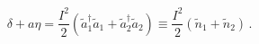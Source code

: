 \begin{equation}
\delta +a\eta = 
\frac{I^2}{2} (\tilde{a}_{1}^{\dagger}\tilde{a}_{1} 
 +\tilde{a}_{2}^{\dagger}\tilde{a}_{2}) 
\equiv \frac{I^2}{2} (\tilde{n}_{1}+\tilde{n}_{2})\,.
\label{eq:4.1.16}
\end{equation}

